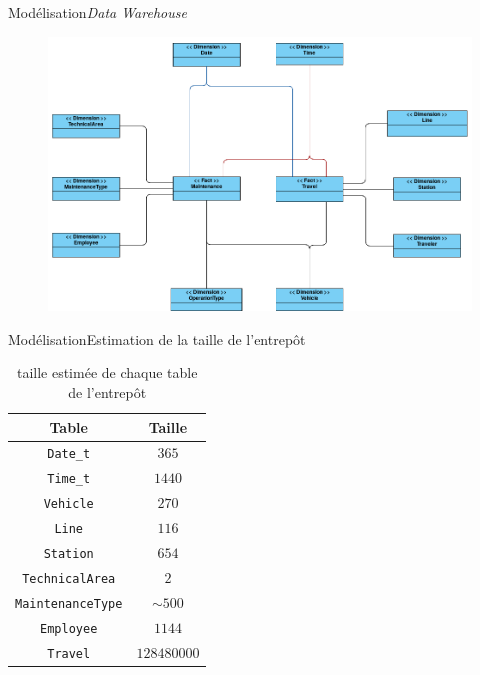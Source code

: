 \documentclass[a4paper,12pt,usenames,dvipsnames]{beamer}
\begin{document}
\begin{frame}{Modélisation}{\textit{Data Warehouse}}
\begin{figure}[!ht]
  \centering
  \includegraphics[scale=0.25]{images/data_warehouse.png}
\end{figure}
\end{frame}

\begin{frame}{Modélisation}{Estimation de la taille de l'entrepôt}
\begin{table}[!ht]
  \centering
  \begin{tabular}{|c|c|}
    \hline
    \textbf{Table} & \textbf{Taille}\\
    \hline
    \texttt{Date\_t} & $365$\\
    \hline
    \texttt{Time\_t} & $1440$\\
    \hline
    \texttt{Vehicle} & $270$\\
    \hline
    \texttt{Line} & $116$\\
    \hline
    \texttt{Station} & $654$\\
    \hline
    \texttt{TechnicalArea} & $2$\\
    \hline
    \texttt{MaintenanceType} & $\sim500$\\
    \hline
    \texttt{Employee} & $1144$\\
    \hline
    \texttt{Travel} & $128480000$\\
    \hline
  \end{tabular}
  \caption{taille estimée de chaque table de l'entrepôt}
\end{table}
\end{frame}
\end{document}
